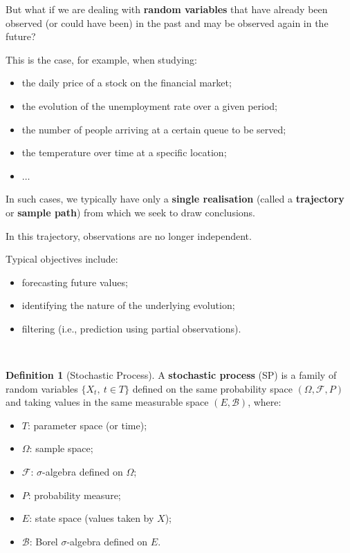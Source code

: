 \documentclass[
  11pt,
  a4paper,
]{book}
\theoremstyle{definition}
\newtheorem{definition}{Definition}[chapter]
\theoremstyle{definition}
\theoremstyle{definition}
\theoremstyle{definition}
\theoremstyle{remark}
\begin{document}
But what if we are dealing with \textbf{random variables} that have already been observed (or could have been) in the past and may be observed again in the future?

This is the case, for example, when studying:

\begin{itemize}
\item
  the daily price of a stock on the financial market;
\item
  the evolution of the unemployment rate over a given period;
\item
  the number of people arriving at a certain queue to be served;
\item
  the temperature over time at a specific location;
\item
  \(\ldots\)
\end{itemize}

In such cases, we typically have only a \textbf{single realisation} (called a \textbf{trajectory} or \textbf{sample path}) from which we seek to draw conclusions.

In this trajectory, observations are no longer independent.

Typical objectives include:

\begin{itemize}
\item
  forecasting future values;
\item
  identifying the nature of the underlying evolution;
\item
  filtering (i.e., prediction using partial observations).
\end{itemize}

\(\,\)

\begin{definition}[Stochastic Process]

A \textbf{stochastic process} (SP) is a family of random variables \(\{X_t, ~t \in T\}\) defined on the same probability space \((\Omega, \mathcal{F}, P)\) and taking values in the same measurable space \((E, \mathcal{B})\), where:

\begin{itemize}
\item
  \(T\): parameter space (or time);
\item
  \(\Omega\): sample space;
\item
  \(\mathcal{F}\): \(\sigma\)-algebra defined on \(\Omega\);
\item
  \(P\): probability measure;
\item
  \(E\): state space (values taken by \(X\));
\item
  \(\mathcal{B}\): Borel \(\sigma\)-algebra defined on \(E\).
\end{itemize}

\end{definition}
\end{document}
